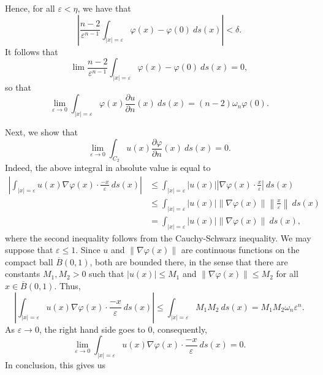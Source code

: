 \documentclass[10pt]{amsart}
\theoremstyle{thmstyle}
\theoremstyle{defstyle}
\renewcommand{\le}{\leqslant}
\begin{document}
Hence, for all $\varepsilon < \eta$, we have that 
\begin{equation*}
	\left|\frac{n - 2}{\varepsilon^{n - 1}}\int_{|x| = \varepsilon}\varphi(x) - \varphi(0)~ds(x)\right| < \delta.
\end{equation*}
It follows that 
\begin{equation*}
	\lim\frac{n - 2}{\varepsilon^{n - 1}}\int_{|x| = \varepsilon}\varphi(x) - \varphi(0)~ds(x) = 0,
\end{equation*}
so that
\begin{equation*}
	\lim_{\varepsilon\to 0}\int_{|x| = \varepsilon}\varphi(x)\frac{\partial u}{\partial n}(x)~ds(x) = (n - 2)\omega_n\varphi(0).
\end{equation*}

Next, we show that 
\begin{equation*}
	\lim_{\varepsilon\to 0}\int_{C_2} u(x)\frac{\partial\varphi}{\partial n}(x)~ds(x) = 0.
\end{equation*}
Indeed, the above integral in absolute value is equal to 
\begin{align*}
	\left|\int_{|x| = \varepsilon} u(x)\nabla\varphi(x)\cdot\frac{-x}{\varepsilon}~ds(x)\right| &\le\int_{|x| = \varepsilon}|u(x)|\left|\nabla\varphi(x)\cdot\frac{x}{\varepsilon}\right|~ds(x)\\
	&\le\int_{|x| = \varepsilon}|u(x)|\|\nabla \varphi(x)\|\left\|\frac{x}{\varepsilon}\right\|~ds(x)\\
	&= \int_{|x| = \varepsilon} |u(x)|\|\nabla \varphi(x)\|~ds(x),
\end{align*}
where the second inequality follows from the Cauchy-Schwarz inequality. We may suppose that $\varepsilon\le 1$. Since $u$ and $\|\nabla\varphi(x)\|$ are continuous functions on the compact ball $\overline B(0, 1)$, both are bounded there, in the sense that there are constants $M_1, M_2 > 0$ such that $|u(x)|\le M_1$ and $\|\nabla\varphi(x)\|\le M_2$ for all $x\in\overline B(0, 1)$. Thus, 
\begin{equation*}
	\left|\int_{|x| = \varepsilon} u(x)\nabla\varphi(x)\cdot\frac{-x}{\varepsilon}~ds(x)\right| \le\int_{|x| = \varepsilon}M_1M_2~ds(x) = M_1M_2\omega_n\varepsilon^{n}.
\end{equation*}
As $\varepsilon\to 0$, the right hand side goes to $0$, consequently, 
\begin{equation*}
	\lim_{\varepsilon\to 0}\int_{|x| = \varepsilon} u(x)\nabla\varphi(x)\cdot\frac{-x}{\varepsilon}~ds(x) = 0.
\end{equation*}
In conclusion, this gives us 
\end{document}
